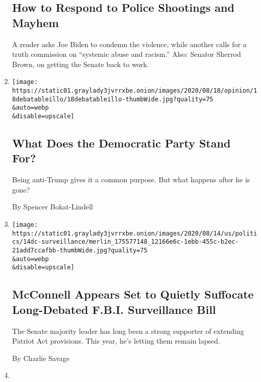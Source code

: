 \begin{enumerate}
  \hypertarget{how-to-respond-to-police-shootings-and-mayhem}{%
  \subsection{How to Respond to Police Shootings and
  Mayhem}\label{how-to-respond-to-police-shootings-and-mayhem}}

  A reader asks Joe Biden to condemn the violence, while another calls
  for a truth commission on ``systemic abuse and racism.'' Also: Senator
  Sherrod Brown, on getting the Senate back to work.
\item
  \href{/2020/08/18/opinion/democratic-party-trump-aoc.html}{}

  \texttt{[image: https://static01.graylady3jvrrxbe.onion/images/2020/08/18/opinion/18debatableillo/18debatableillo-thumbWide.jpg?quality=75\\\&auto=webp\\\&disable=upscale]}

  \hypertarget{what-does-the-democratic-party-stand-for}{%
  \subsection{What Does the Democratic Party Stand
  For?}\label{what-does-the-democratic-party-stand-for}}

  Being anti-Trump gives it a common purpose. But what happens after he
  is gone?

  By Spencer Bokat-Lindell
\item
  \href{/2020/08/14/us/politics/mcconnell-fisa-bill.html}{}

  \texttt{[image: https://static01.graylady3jvrrxbe.onion/images/2020/08/14/us/politics/14dc-surveillance/merlin\_175577148\_12166e6c-1ebb-455c-b2ec-21add7ccafbb-thumbWide.jpg?quality=75\\\&auto=webp\\\&disable=upscale]}

  \hypertarget{mcconnell-appears-set-to-quietly-suffocate-long-debated-fbi-surveillance-bill}{%
  \subsection{McConnell Appears Set to Quietly Suffocate Long-Debated
  F.B.I. Surveillance
  Bill}\label{mcconnell-appears-set-to-quietly-suffocate-long-debated-fbi-surveillance-bill}}

  The Senate majority leader has long been a strong supporter of
  extending Patriot Act provisions. This year, he's letting them remain
  lapsed.

  By Charlie Savage
\item
  \href{/2020/08/11/us/politics/congress-coronavirus-relief-bill.html}{}


\end{enumerate}
